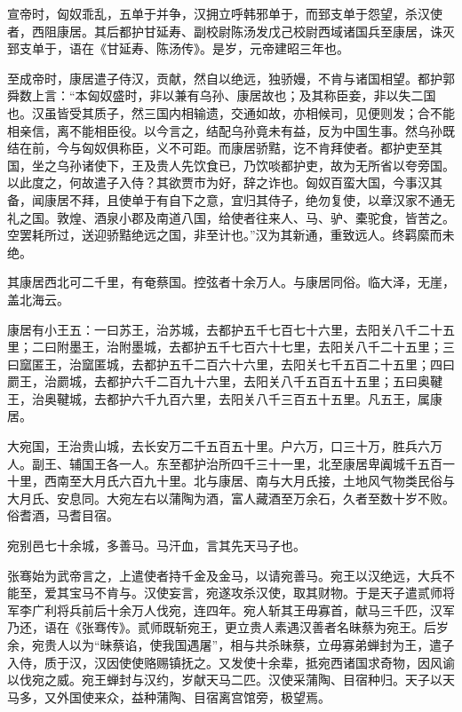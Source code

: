 \documentclass[12pt,UTF8]{ctexbook}
\begin{document}
宣帝时，匈奴乖乱，五单于并争，汉拥立呼韩邪单于，而郅支单于怨望，杀汉使者，西阻康居。其后都护甘延寿、副校尉陈汤发戊己校尉西域诸国兵至康居，诛灭郅支单于，语在《甘延寿、陈汤传》。是岁，元帝建昭三年也。



至成帝时，康居遣子侍汉，贡献，然自以绝远，独骄嫚，不肯与诸国相望。都护郭舜数上言：“本匈奴盛时，非以兼有乌孙、康居故也；及其称臣妾，非以失二国也。汉虽皆受其质子，然三国内相输遗，交通如故，亦相候司，见便则发；合不能相亲信，离不能相臣役。以今言之，结配乌孙竟未有益，反为中国生事。然乌孙既结在前，今与匈奴俱称臣，义不可距。而康居骄黠，讫不肯拜使者。都护吏至其国，坐之乌孙诸使下，王及贵人先饮食已，乃饮啖都护吏，故为无所省以夸旁国。以此度之，何故遣子入侍？其欲贾市为好，辞之诈也。匈奴百蛮大国，今事汉其备，闻康居不拜，且使单于有自下之意，宜归其侍子，绝勿复使，以章汉家不通无礼之国。敦煌、酒泉小郡及南道八国，给使者往来人、马、驴、橐驼食，皆苦之。空罢耗所过，送迎骄黠绝远之国，非至计也。”汉为其新通，重致远人。终羁縻而未绝。



其康居西北可二千里，有奄蔡国。控弦者十余万人。与康居同俗。临大泽，无崖，盖北海云。



康居有小王五：一曰苏王，治苏城，去都护五千七百七十六里，去阳关八千二十五里；二曰附墨王，治附墨城，去都护五千七百六十七里，去阳关八千二十五里；三曰窳匿王，治窳匿城，去都护五千二百六十六里，去阳关七千五百二十五里；四曰罽王，治罽城，去都护六千二百九十六里，去阳关八千五百五十五里；五曰奥鞬王，治奥鞬城，去都护六千九百六里，去阳关八千三百五十五里。凡五王，属康居。



大宛国，王治贵山城，去长安万二千五百五十里。户六万，口三十万，胜兵六万人。副王、辅国王各一人。东至都护治所四千三十一里，北至康居卑阗城千五百一十里，西南至大月氏六百九十里。北与康居、南与大月氏接，土地风气物类民俗与大月氏、安息同。大宛左右以蒲陶为酒，富人藏酒至万余石，久者至数十岁不败。俗耆酒，马耆目宿。



宛别邑七十余城，多善马。马汗血，言其先天马子也。



张骞始为武帝言之，上遣使者持千金及金马，以请宛善马。宛王以汉绝远，大兵不能至，爱其宝马不肯与。汉使妄言，宛遂攻杀汉使，取其财物。于是天子遣贰师将军李广利将兵前后十余万人伐宛，连四年。宛人斩其王毋寡首，献马三千匹，汉军乃还，语在《张骞传》。贰师既斩宛王，更立贵人素遇汉善者名昧蔡为宛王。后岁余，宛贵人以为“昧蔡谄，使我国遇屠”，相与共杀昧蔡，立毋寡弟蝉封为王，遣子入侍，质于汉，汉因使使赂赐镇抚之。又发使十余辈，抵宛西诸国求奇物，因风谕以伐宛之威。宛王蝉封与汉约，岁献天马二匹。汉使采蒲陶、目宿种归。天子以天马多，又外国使来众，益种蒲陶、目宿离宫馆旁，极望焉。
\end{document}
